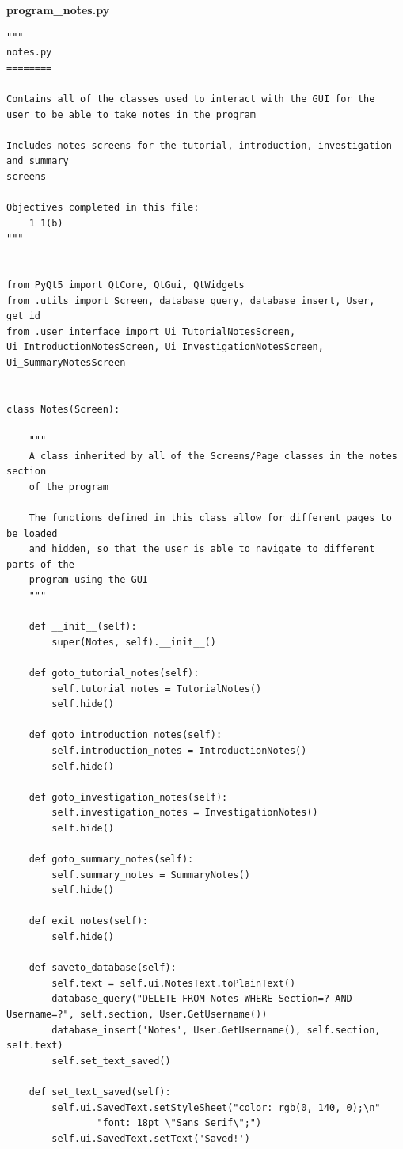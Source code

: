 \documentclass[12pt]{article}
\begin{document}
\textbf{program\_notes.py}
\begin{lstlisting}
"""
notes.py
========

Contains all of the classes used to interact with the GUI for the
user to be able to take notes in the program

Includes notes screens for the tutorial, introduction, investigation and summary
screens

Objectives completed in this file:
    1 1(b)
"""


from PyQt5 import QtCore, QtGui, QtWidgets
from .utils import Screen, database_query, database_insert, User, get_id
from .user_interface import Ui_TutorialNotesScreen, Ui_IntroductionNotesScreen, Ui_InvestigationNotesScreen, Ui_SummaryNotesScreen


class Notes(Screen):

    """
    A class inherited by all of the Screens/Page classes in the notes section
    of the program

    The functions defined in this class allow for different pages to be loaded
    and hidden, so that the user is able to navigate to different parts of the
    program using the GUI
    """

    def __init__(self):
        super(Notes, self).__init__()

    def goto_tutorial_notes(self):
        self.tutorial_notes = TutorialNotes()
        self.hide()

    def goto_introduction_notes(self):
        self.introduction_notes = IntroductionNotes()
        self.hide()

    def goto_investigation_notes(self):
        self.investigation_notes = InvestigationNotes()
        self.hide()

    def goto_summary_notes(self):
        self.summary_notes = SummaryNotes()
        self.hide()

    def exit_notes(self):
        self.hide()

    def saveto_database(self):
        self.text = self.ui.NotesText.toPlainText()
        database_query("DELETE FROM Notes WHERE Section=? AND Username=?", self.section, User.GetUsername())
        database_insert('Notes', User.GetUsername(), self.section, self.text)
        self.set_text_saved()

    def set_text_saved(self):
        self.ui.SavedText.setStyleSheet("color: rgb(0, 140, 0);\n"
                "font: 18pt \"Sans Serif\";")
        self.ui.SavedText.setText('Saved!')


\end{lstlisting}
\end{document}
